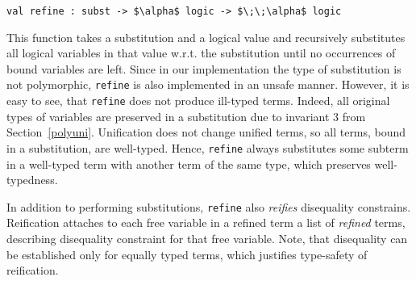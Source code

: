 \documentclass[10pt, oneside, nocopyrightspace]{sigplanconf}
\begin{document}
\begin{lstlisting}[mathescape=true]
   val refine : subst -> $\alpha$ logic -> $\;\;\alpha$ logic
\end{lstlisting}

This function takes a substitution and a logical value and recursively substitutes
all logical variables in that value w.r.t. the substitution until no occurrences of 
bound variables are left. Since in our implementation the type of substitution is
not polymorphic, \lstinline{refine} is also implemented in an unsafe manner. However,
it is easy to see, that \lstinline{refine} does not produce ill-typed terms. Indeed,
all original types of variables are preserved in a substitution due to invariant
3 from Section~\ref{polyuni}. Unification does not change unified terms, so all terms, 
bound in a substitution, are well-typed. Hence, \lstinline{refine} always substitutes
some subterm in a well-typed term with another term of the same type, which preserves
well-typedness.

In addition to performing substitutions, \lstinline{refine} also \emph{reifies} 
disequality constrains. Reification attaches to each free variable in a refined
term a list of \emph{refined} terms, describing disequality constraint for that
free variable. Note, that disequality can be established only for equally typed
terms, which justifies type-safety of reification. 

\begin{comment}
Note also, that additional care has 
to be taken to avoid infinite looping, since refinement and reification are
mutually recursive, and refinement of a variable can be potentially invoked from 
itself due to a chain of disequalify constraints.

After refinement the content of logical value can be inspected via the following 
function:

\begin{lstlisting}[mathescape=true]
   val destruct : $\alpha$ logic -> 
     [`Var of int * $\alpha$ logic list | `Value of $\alpha$]
\end{lstlisting}

Constructor \lstinline{`Var} corresponds to a free variable with unique
integer identifier and a list of terms, representing all disequality constraints
for this variable. These terms are refined as well.
\end{comment}

\begin{comment}
We did not make \lstinline{refine} accessible for an end-user; instead we provided
a set of top-level combinators, which should be used to surround relational code
and perform refinement in a transparent manner. Note, that from pragmatic
standpoint only variables, supplied as arguments for the top-level goal, have
to be refined (the original miniKanren implementation follows the same convention).
\end{comment}
\end{document}

